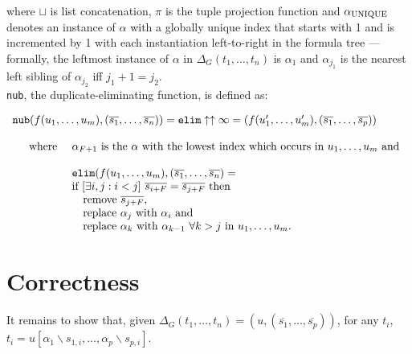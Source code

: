 \documentclass[a4paper, 11pt]{report}
\newcommand{\mt}[1]{\textnormal{#1}}
\begin{document}
\noindent
where $\sqcup$ is list concatenation, $\pi$ is the tuple projection function and $\alpha_{\mt{UNIQUE}}$ denotes an instance of $\alpha$ with a globally unique index that starts with 1 and is incremented by 1 with each instantiation left-to-right in the formula tree --- formally, the leftmost instance of $\alpha$ in $\Delta_G(t_1,\dots,t_n)$ is $\alpha_1$ and $\alpha_{j_1}$ is the nearest left sibling of $\alpha_{j_2}$ iff $j_1+1=j_2$.\\

\noindent
\texttt{nub}, the duplicate-eliminating function, is defined as:

$$
  \begin{array}{l}
    \texttt{nub}(f(u_1,\dots,u_m), (\overline{s_1},\dots,\overline{s_n})) = \texttt{elim} \uparrow \uparrow \infty =
    (f(u_1',\dots,u_m'), (\overline{s_1},\dots,\overline{s_p}))\\

    \\

    \quad 
      \begin{array}{l l}
        \mt{where } &
        \alpha_{F+1} \mt{ is the } \alpha \mt{ with the lowest index which occurs in } u_1,\dots,u_m \mt{ and}\\

        \\

        & \texttt{elim}(f(u_1,\dots,u_m), (\overline{s_1},\dots,\overline{s_n}) =\\
        & \mt{if } [\exists i,j: i < j]\ \overline{s_{i+F}} = \overline{s_{j+F}} \mt { then}\\
        & \quad \mt{remove } \overline{s_{j+F}},\\
        & \quad \mt{replace } \alpha_j \mt { with } \alpha_i \mt{ and }\\
        & \quad \mt{replace } \alpha_k \mt{ with } \alpha_{k-1}\ \forall k > j \mt{ in } u_1,\dots,u_m \mt{.}
        \\
      \end{array}
  \end{array}
$$

\section{Correctness}

It remains to show that, given $\Delta_G(t_1,\dots,t_n) = (u,(\overline{s_1},\dots,\overline{s_p}))$, for any $t_i$, $t_i = u[\alpha_1\backslash s_{1,i},\dots,\alpha_p\backslash s_{p,i}]$.
\end{document}

